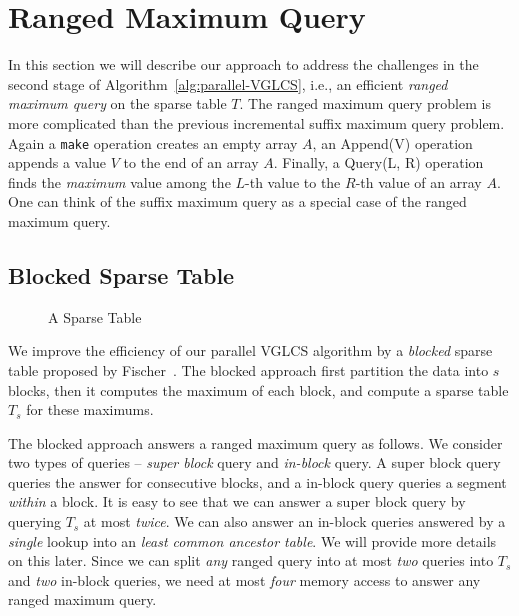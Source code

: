 \section{Ranged Maximum Query} \label{sec:parallelRMQ}

In this section we will describe our approach to address the
challenges in the second stage of Algorithm~\ref{alg:parallel-VGLCS},
i.e., an efficient {\em ranged maximum query} on the sparse table $T$.
The ranged maximum query problem is more complicated than the previous
incremental suffix maximum query problem.  Again a {\tt make}
operation creates an empty array $A$, an {\sc Append(V)} operation
appends a value $V$ to the end of an array $A$.  Finally, a {\sc
  Query(L, R)} operation finds the {\em maximum} value among the
$L$-th value to the $R$-th value of an array $A$.  One can think of
the suffix maximum query as a special case of the ranged maximum
query.


\subsection{Blocked Sparse Table}

\begin{figure}[!thb]
  \centering {} 
  \caption{A Sparse Table}
  \label{fig:block-interval-decomposition}
\end{figure}

We improve the efficiency of our parallel VGLCS algorithm by a {\em
  blocked} sparse table proposed by
Fischer~\cite{Fischer2006TheoreticalAP}.  The blocked approach first
partition the data into $s$ blocks, then it computes the maximum of
each block, and compute a sparse table $T_s$ for these maximums.

The blocked approach answers a ranged maximum query as follows.  We
consider two types of queries -- {\em super block} query and {\em
  in-block} query.  A super block query queries the answer for
consecutive blocks, and a in-block query queries a segment {\em
  within} a block.  It is easy to see that we can answer a super block
query by querying $T_s$ at most {\em twice}.  We can also answer an
in-block queries answered by a {\em single} lookup into an {\em least
  common ancestor table}.  We will provide more details on this later.
Since we can split {\em any} ranged query into at most {\em two}
queries into $T_s$ and {\em two} in-block queries, we need at most
{\em four} memory access to answer any ranged maximum query.

